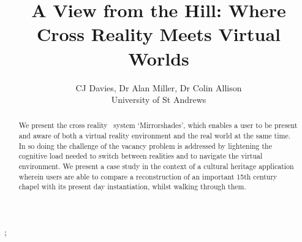 \documentclass[tog]{acmsiggraph}
\title{A View from the Hill: Where Cross Reality Meets Virtual Worlds}
\author{CJ Davies, Dr Alan Miller, Dr Colin Allison\\University of St Andrews}
\begin{document}



\maketitle


\begin{abstract}
We present the cross reality~\cite{Lifton2007a} system `Mirrorshades', which enables a user to be present and aware of both a virtual reality environment and the real world at the same time. In so doing the challenge of the vacancy problem is addressed by lightening the cognitive load needed to switch between realities and to navigate the virtual environment. We present a case study in the context of a cultural heritage application wherein users are able to compare a reconstruction of an important 15th century chapel with its present day instantiation, whilst walking through them.

\end{abstract}


\begin{CRcatlist}
  ;
\end{CRcatlist}
\end{document}
